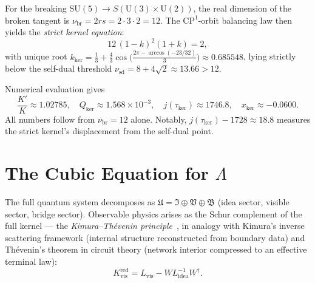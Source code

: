 \documentclass[12pt]{article}
\begin{document}
For the breaking $\mathrm{SU}(5)\to S(\mathrm{U}(3)\times\mathrm{U}(2))$,
the real dimension of the broken tangent is
$\nu_{\mathrm{br}}=2rs=2\cdot3\cdot2=12$.
The $\mathrm{CP}^1$-orbit balancing law then yields the
\emph{strict kernel equation}:
\begin{equation}
\boxed{12\,(1-k)^2(1+k)=2,}
\label{eq:sk}
\end{equation}
with unique root
$k_{\mathrm{ker}}=\frac{1}{3}+\frac{4}{3}\cos\!\bigl(\frac{2\pi-\arccos(-23/32)}{3}\bigr)
\approx 0.685548$,
lying strictly below the self-dual threshold
$\nu_{\mathrm{sd}}=8+4\sqrt{2}\approx13.66>12$.

Numerical evaluation gives
\begin{equation}
\frac{K'}{K}\approx 1.02785,\quad
Q_{\mathrm{ker}}\approx 1.568\times 10^{-3},\quad
j(\tau_{\mathrm{ker}})\approx 1746.8,\quad
x_{\mathrm{ker}}\approx -0.0600.
\end{equation}
All numbers follow from $\nu_{\mathrm{br}}=12$ alone.
Notably, $j(\tau_{\mathrm{ker}})-1728\approx18.8$ measures
the strict kernel's displacement from the self-dual point.

\section{The Cubic Equation for $\Lambda$}

The full quantum system decomposes as
$\mathfrak{U}=\mathfrak{I}\oplus\mathfrak{V}\oplus\mathfrak{B}$
(idea sector, visible sector, bridge sector).
Observable physics arises as the Schur complement of the full kernel
--- the \emph{Kimura--Th\'evenin principle}~\cite{Kimura2020,Kimura2021,Kimura2022},
in analogy with Kimura's inverse scattering framework
(internal structure reconstructed from boundary data)
and Th\'evenin's theorem in circuit theory
(network interior compressed to an effective terminal law):
\begin{equation}
K_{\mathrm{vis}}^{\mathrm{red}}
= L_{\mathrm{vis}} - W L_{\mathrm{idea}}^{-1} W^\dagger.
\label{eq:Schur}
\end{equation}
\end{document}
